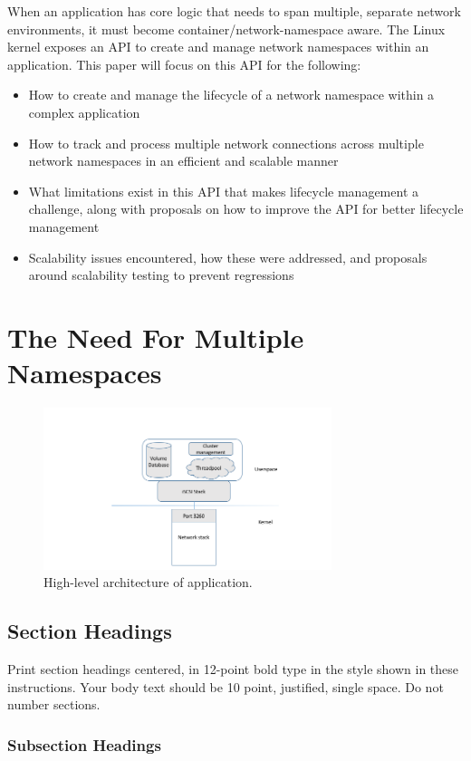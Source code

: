 \documentclass[letterpaper]{article}
\begin{document}
When an application has core logic that needs to span multiple, separate network environments, it must become container/network-namespace aware. The Linux kernel exposes an API to create and manage network namespaces within an application. This paper will focus on this API for the following:
\begin{itemize}
\item How to create and manage the lifecycle of a network namespace within a complex application
\item How to track and process multiple network connections across multiple network namespaces in an efficient and scalable manner
\item What limitations exist in this API that makes lifecycle management a challenge, along with proposals on how to improve the API for better lifecycle management
\item Scalability issues encountered, how these were addressed, and proposals around scalability testing to prevent regressions
\end{itemize}

\section{The Need For Multiple Namespaces}
\begin{figure}[h]
\includegraphics[width=3.31in]{standard-app-overview.png}
\caption{High-level architecture of application.}
\end{figure}

\subsection{Section Headings}

Print section headings centered, in 12-point bold type in the style shown in these instructions. Your body text should be 10 point, justified, single space. Do not number sections.

\subsubsection{Subsection Headings}
\end{document}
